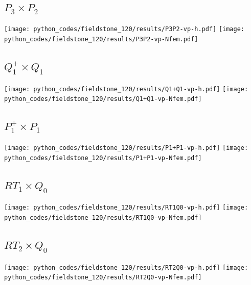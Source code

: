 \subsection*{$P_3\times P_2$}
\begin{center}
\texttt{[image: python\_codes/fieldstone\_120/results/P3P2-vp-h.pdf]}
\texttt{[image: python\_codes/fieldstone\_120/results/P3P2-vp-Nfem.pdf]}
\end{center}

\newpage
\subsection*{$Q_1^+\times Q_1$}
\begin{center}
\texttt{[image: python\_codes/fieldstone\_120/results/Q1+Q1-vp-h.pdf]}
\texttt{[image: python\_codes/fieldstone\_120/results/Q1+Q1-vp-Nfem.pdf]}
\end{center}

\subsection*{$P_1^+\times P_1$}
\begin{center}
\texttt{[image: python\_codes/fieldstone\_120/results/P1+P1-vp-h.pdf]}
\texttt{[image: python\_codes/fieldstone\_120/results/P1+P1-vp-Nfem.pdf]}
\end{center}

\subsection*{$RT_1\times Q_0$}
\begin{center}
\texttt{[image: python\_codes/fieldstone\_120/results/RT1Q0-vp-h.pdf]}
\texttt{[image: python\_codes/fieldstone\_120/results/RT1Q0-vp-Nfem.pdf]}
\end{center}

\subsection*{$RT_2\times Q_0$}
\begin{center}
\texttt{[image: python\_codes/fieldstone\_120/results/RT2Q0-vp-h.pdf]}
\texttt{[image: python\_codes/fieldstone\_120/results/RT2Q0-vp-Nfem.pdf]}
\end{center}

